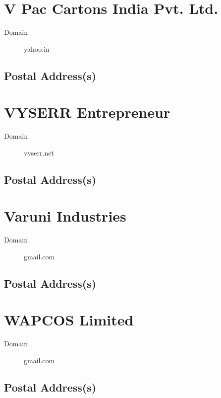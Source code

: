 \documentclass[a4paper, 11pt, twoside]{book}
\begin{document}
\section{V Pac Cartons India Pvt. Ltd.}\label{com:57}
\begin{description}
\item[Domain]yahoo.in
\end{description}
\subsection*{Postal Address(s)}
\section{VYSERR Entrepreneur}\label{com:53}
\begin{description}
\item[Domain]vyserr.net
\end{description}
\subsection*{Postal Address(s)}
\section{Varuni Industries}\label{com:58}
\begin{description}
\item[Domain]gmail.com
\end{description}
\subsection*{Postal Address(s)}
\section{WAPCOS Limited}\label{com:63}
\begin{description}
\item[Domain]gmail.com
\end{description}
\subsection*{Postal Address(s)}
\end{document}

